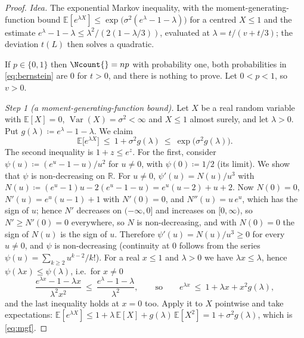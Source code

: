 \begin{proof}
\emph{Idea.} The exponential Markov inequality, with the
moment-generating-function bound $\mathbb{E}[e^{\lambda X}]\le
\exp\big(\sigma^{2}(e^{\lambda}-1-\lambda)\big)$ for a centred $X\le1$ and the
estimate $e^{\lambda}-1-\lambda\le\lambda^{2}/(2(1-\lambda/3))$, evaluated at
$\lambda=t/(v+t/3)$; the deviation $t(L)$ then solves a quadratic.

If $p\in\{0,1\}$ then $\Ncount{}=np$ with probability one, both
probabilities in \eqref{eq:bernstein} are $0$ for $t>0$, and there is nothing
to prove. Let $0<p<1$, so $v>0$.

\emph{Step 1 (a moment-generating-function bound).} Let $X$ be a real random
variable with $\mathbb{E}[X]=0$, $\operatorname{Var}(X)=\sigma^{2}<\infty$ and
$X\le1$ almost surely, and let $\lambda>0$. Put
$g(\lambda)\coloneqq e^{\lambda}-1-\lambda$. We claim
\begin{equation}\label{eq:mgf}
  \mathbb{E}\big[e^{\lambda X}\big]\ \le\ 1+\sigma^{2}g(\lambda)\ \le\
  \exp\big(\sigma^{2}g(\lambda)\big).
\end{equation}
The second inequality is $1+z\le e^{z}$. For the first, consider
$\psi(u)\coloneqq(e^{u}-1-u)/u^{2}$ for $u\neq0$, with $\psi(0)\coloneqq1/2$
(its limit). We show that $\psi$ is non-decreasing on $\mathbb{R}$. For
$u\neq0$, $\psi'(u)=N(u)/u^{3}$ with
$N(u)\coloneqq(e^{u}-1)u-2(e^{u}-1-u)=e^{u}(u-2)+u+2$. Now $N(0)=0$,
$N'(u)=e^{u}(u-1)+1$ with $N'(0)=0$, and $N''(u)=u\,e^{u}$, which has the sign
of $u$; hence $N'$ decreases on $(-\infty,0]$ and increases on $[0,\infty)$,
so $N'\ge N'(0)=0$ everywhere, so $N$ is non-decreasing, and with $N(0)=0$
the sign of $N(u)$ is the sign of $u$. Therefore $\psi'(u)=N(u)/u^{3}\ge0$ for
every $u\neq0$, and $\psi$ is non-decreasing (continuity at $0$ follows from
the series $\psi(u)=\sum_{k\ge2}u^{k-2}/k!$). For a real $x\le1$ and
$\lambda>0$ we have $\lambda x\le\lambda$, hence
$\psi(\lambda x)\le\psi(\lambda)$, i.e.\ for $x\neq0$
\begin{equation*}
  \frac{e^{\lambda x}-1-\lambda x}{\lambda^{2}x^{2}}\ \le\
  \frac{e^{\lambda}-1-\lambda}{\lambda^{2}},
  \qquad\text{so}\qquad
  e^{\lambda x}\ \le\ 1+\lambda x+x^{2}g(\lambda),
\end{equation*}
and the last inequality holds at $x=0$ too. Apply it to $X$ pointwise and
take expectations: $\mathbb{E}[e^{\lambda X}]\le1+\lambda\,\mathbb{E}[X]
+g(\lambda)\,\mathbb{E}[X^{2}]=1+\sigma^{2}g(\lambda)$, which is
\eqref{eq:mgf}.


\end{proof}
